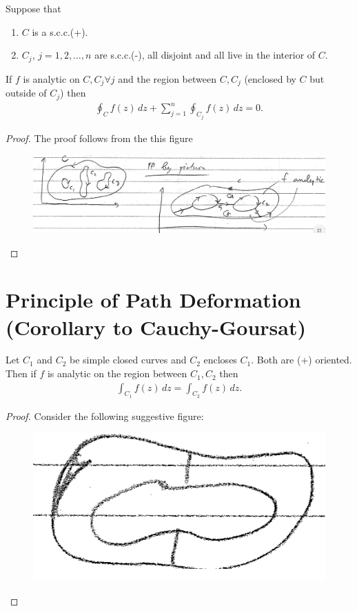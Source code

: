 \documentclass{article}
\theoremstyle{definition}
\begin{document}
Suppose that
\begin{enumerate}
	\item $C$ is a s.c.c.(+).
	\item $C_j$, $j=1,2,\dots,n$ are s.c.c.(-), all disjoint and all live in the interior of $C$.
\end{enumerate}
If $f$ is analytic on $C,C_j \forall j$ and the region between $C, C_j$ (enclosed by $C$ but outside of $C_j$) then 
\begin{align}
\oint_C f(z)\,dz + \sum^n_{j=1}\oint_{C_j}f(z)\,dz = 0.
\end{align}

\begin{proof}
	The proof follows from the this figure
	\begin{figure}[!htb]
		\centering
		\includegraphics[scale=0.25]{C-G-multi}
	\end{figure}


\end{proof}






\section{Principle of Path Deformation (Corollary to Cauchy-Goursat)}


Let $C_1$ and $C_2$ be simple closed curves and $C_2$ encloses $C_1$. Both are (+) oriented. Then if $f$ is analytic on the region between $C_1, C_2$ then
\begin{align}
\int_{C_1}f(z)\,dz = \int_{C_2}f(z)\,dz.
\end{align}

\begin{proof}
	Consider the following suggestive figure:
	\begin{figure}[!htb]
		\centering
		\includegraphics[scale=0.25]{deform}
	\end{figure}
\end{proof}
\end{document}
